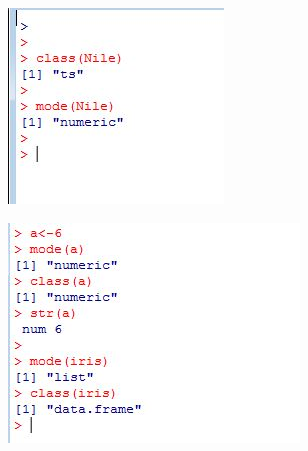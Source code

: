 \documentclass{beamer}
\begin{document}
 	\begin{frame}
 		\begin{figure}
 			\centering
 			\includegraphics[width=1.2\linewidth]{images/classnile}
 		\end{figure}
 		
 		
 	\end{frame}
 	\begin{frame}
 		\begin{figure}
 			\centering
 			\includegraphics[width=0.9\linewidth]{images/modeclass}
 			
 		\end{figure}
 		
 		
 	\end{frame}
 	
\end{document}
